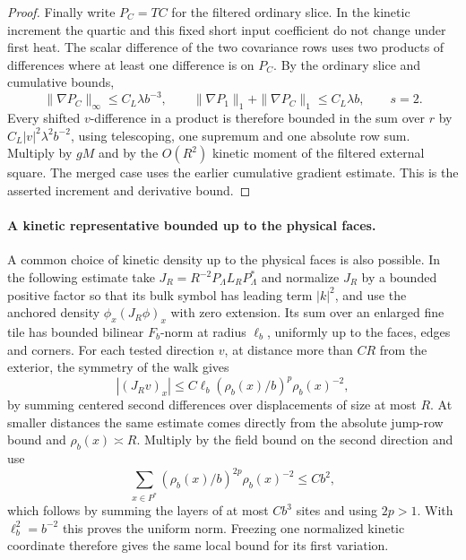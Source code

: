 \documentclass[11pt]{article}
\theoremstyle{definition}
\begin{document}
\begin{proof}
Finally write \(P_C=TC\) for the filtered ordinary
slice. In the kinetic increment the quartic and this
fixed short input coefficient do not change under first
heat. The scalar difference of the two covariance rows
uses two products of differences where at least one
difference is on \(P_C\). By the ordinary slice and
cumulative bounds,
\begin{equation}
 \|\nabla P_C\|_\infty\le C_L\lambda b^{-3},\qquad
 \|\nabla P_1\|_1+\|\nabla P_C\|_1\le C_L\lambda b ,
 \qquad s=2 .
\end{equation}
Every shifted \(v\)-difference in a product is therefore
bounded in the sum over \(r\) by \(C_L|v|^2\lambda^2 b^{-2}\),
using telescoping, one supremum and one absolute row sum.
Multiply by \(g M\) and by the \(O(R^2)\) kinetic
moment of the filtered external square. The merged case
uses the earlier cumulative gradient estimate. This is the
asserted increment and derivative bound.
\end{proof}

\paragraph{A kinetic representative bounded up to the physical faces.}
A common choice of kinetic density up to the physical faces is
also possible. In the following estimate take
\(J_R=R^{-2}P_\Lambda L_RP_\Lambda^*\) and normalize
\(J_R\) by a bounded positive factor so that its bulk symbol
has leading term \(|k|^2\), and use the anchored density
\(\phi_x(J_R\phi)_x\) with zero extension. Its sum over an
enlarged fine tile has bounded bilinear \(F_b\)-norm at
radius \(\ell_b\), uniformly up to the faces, edges and
corners. For each tested direction \(v\), at distance more
than \(C R\) from the exterior, the symmetry of the walk
gives
\begin{equation}
 |(J_Rv)_x|\le C\ell_b(\rho_b(x)/b)^p\rho_b(x)^{-2},
\end{equation}
by summing centered second differences over displacements
of size at most \(R\). At smaller distances the same
estimate comes directly from the absolute jump-row bound
and \(\rho_b(x)\asymp R\). Multiply by the field bound
on the second direction and use
\begin{equation}
 \sum_{x\in P^*}(\rho_b(x)/b)^{2p}\rho_b(x)^{-2}
 \le C b^2 ,
\end{equation}
which follows by summing the layers of at most \(Cb^3\)
sites and using \(2p>1\). With \(\ell_b^2=b^{-2}\)
this proves the uniform norm. Freezing one normalized
kinetic coordinate therefore gives the same local bound
for its first variation.
\end{document}
